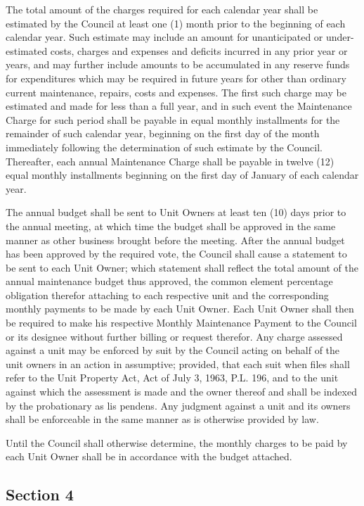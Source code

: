 \documentclass[
]{book}
\begin{document}
The total amount of the charges required for each calendar year shall be estimated by the Council at least one (1) month prior to the beginning of each calendar year. Such estimate may include an amount for unanticipated or under-estimated costs, charges and expenses and deficits incurred in any prior year or years, and may further include amounts to be accumulated in any reserve funds for expenditures which may be required in future years for other than ordinary current maintenance, repairs, costs and expenses. The first such charge may be estimated and made for less than a full year, and in such event the Maintenance Charge for such period shall be payable in equal monthly installments for the remainder of such calendar year, beginning on the first day of the month immediately following the determination of such estimate by the Council. Thereafter, each annual Maintenance Charge shall be payable in twelve (12) equal monthly installments beginning on the first day of January of each calendar year.

The annual budget shall be sent to Unit Owners at least ten (10) days prior to the annual meeting, at which time the budget shall be approved in the same manner as other business brought before the meeting. After the annual budget has been approved by the required vote, the Council shall cause a statement to be sent to each Unit Owner; which statement shall reflect the total amount of the annual maintenance budget thus approved, the common element percentage obligation therefor attaching to each respective unit and the corresponding monthly payments to be made by each Unit Owner. Each Unit Owner shall then be required to make his respective Monthly Maintenance Payment to the Council or its designee without further billing or request therefor. Any charge assessed against a unit may be enforced by suit by the Council acting on behalf of the unit owners in an action in assumptive; provided, that each suit when files shall refer to the Unit Property Act, Act of July 3, 1963, P.L. 196, and to the unit against which the assessment is made and the owner thereof and shall be indexed by the probationary as lis pendens. Any judgment against a unit and its owners shall be enforceable in the same manner as is otherwise provided by law.

Until the Council shall otherwise determine, the monthly charges to be paid by each Unit Owner shall be in accordance with the budget attached.

\hypertarget{section-4-3}{%
\subsection*{Section 4}\label{section-4-3}}
\end{document}
